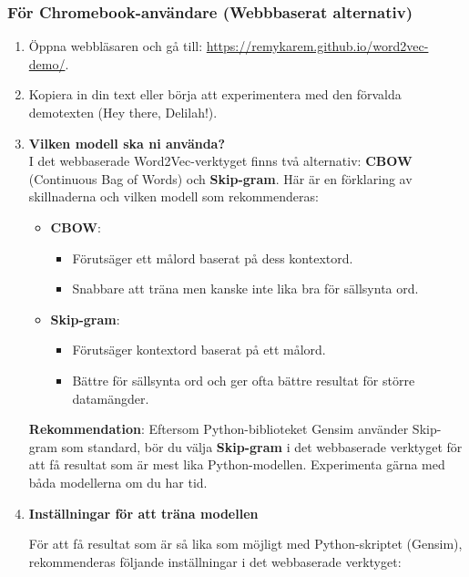 \documentclass[a4paper, 12pt]{article}
\begin{document}
\subsubsection{För Chromebook-användare (Webbbaserat alternativ)}
\begin{enumerate}
    \item Öppna webbläsaren och gå till: \url{https://remykarem.github.io/word2vec-demo/}.
    
    \item Kopiera in din text eller börja att experimentera med den förvalda demotexten (Hey there, Delilah!).
    
    \item \textbf{Vilken modell ska ni använda?}
    \noindent \\
I det webbaserade Word2Vec-verktyget finns två alternativ: \textbf{CBOW} (Continuous Bag of Words) och \textbf{Skip-gram}. Här är en förklaring av skillnaderna och vilken modell som rekommenderas:

\begin{itemize}
    \item \textbf{CBOW}:
        \begin{itemize}
            \item Förutsäger ett målord baserat på dess kontextord.
            \item Snabbare att träna men kanske inte lika bra för sällsynta ord.
        \end{itemize}
    \item \textbf{Skip-gram}:
        \begin{itemize}
            \item Förutsäger kontextord baserat på ett målord.
            \item Bättre för sällsynta ord och ger ofta bättre resultat för större datamängder.
        \end{itemize}
\end{itemize}

\noindent
\textbf{Rekommendation}: Eftersom Python-biblioteket Gensim använder Skip-gram som standard, bör du välja \textbf{Skip-gram} i det webbaserade verktyget för att få resultat som är mest lika Python-modellen. Experimenta gärna med båda modellerna om du har tid.
 
\item \textbf{Inställningar för att träna modellen}

För att få resultat som är så lika som möjligt med Python-skriptet (Gensim), rekommenderas följande inställningar i det webbaserade verktyget:


\end{enumerate}
\end{document}
